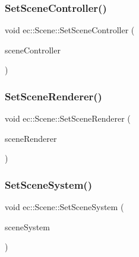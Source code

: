 \subsubsection{\texorpdfstring{Set\+Scene\+Controller()}{SetSceneController()}}
{\footnotesize\ttfamily void ec\+::\+Scene\+::\+Set\+Scene\+Controller (\begin{DoxyParamCaption}\item[{\mbox{\hyperlink{classec_1_1_scene_controller}{Scene\+Controller}} $\ast$}]{scene\+Controller }\end{DoxyParamCaption})}

\mbox{\label{classec_1_1_scene_a3f300f8210249e457121aa0696261b4e}} 
\subsubsection{\texorpdfstring{Set\+Scene\+Renderer()}{SetSceneRenderer()}}
{\footnotesize\ttfamily void ec\+::\+Scene\+::\+Set\+Scene\+Renderer (\begin{DoxyParamCaption}\item[{const \mbox{\hyperlink{classec_1_1_scene_renderer}{Scene\+Renderer}} \&}]{scene\+Renderer }\end{DoxyParamCaption})}

\mbox{\label{classec_1_1_scene_a24962dd137eba3192c3e88e597c7d03d}} 
\subsubsection{\texorpdfstring{Set\+Scene\+System()}{SetSceneSystem()}}
{\footnotesize\ttfamily void ec\+::\+Scene\+::\+Set\+Scene\+System (\begin{DoxyParamCaption}\item[{\mbox{\hyperlink{classec_1_1_scene_system}{Scene\+System}} $\ast$}]{scene\+System }\end{DoxyParamCaption})}

\mbox{\label{classec_1_1_scene_a07895d944a6045fa0ce5712b6a020c91}} 
